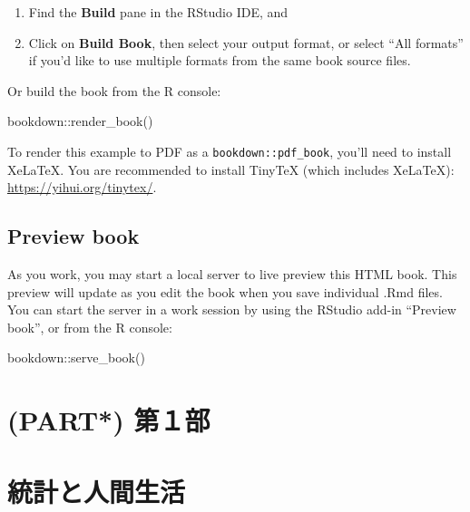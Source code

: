 \documentclass[
]{book}
\newenvironment{Shaded}{\begin{snugshade}}{\end{snugshade}}
\newcommand{\FunctionTok}[1]{\textcolor[rgb]{0.00,0.00,0.00}{#1}}
\newcommand{\NormalTok}[1]{#1}
\newcommand{\SpecialCharTok}[1]{\textcolor[rgb]{0.00,0.00,0.00}{#1}}
\theoremstyle{definition}
\theoremstyle{definition}
\theoremstyle{definition}
\theoremstyle{definition}
\theoremstyle{remark}
\begin{document}
\begin{enumerate}
\def\labelenumi{\arabic{enumi}.}
\item
  Find the \textbf{Build} pane in the RStudio IDE, and
\item
  Click on \textbf{Build Book}, then select your output format, or select ``All formats'' if you'd like to use multiple formats from the same book source files.
\end{enumerate}

Or build the book from the R console:

\begin{Shaded}
\begin{Highlighting}[]
\NormalTok{bookdown}\SpecialCharTok{::}\FunctionTok{render\_book}\NormalTok{()}
\end{Highlighting}
\end{Shaded}

To render this example to PDF as a \texttt{bookdown::pdf\_book}, you'll need to install XeLaTeX. You are recommended to install TinyTeX (which includes XeLaTeX): \url{https://yihui.org/tinytex/}.

\hypertarget{preview-book}{%
\section{Preview book}\label{preview-book}}

As you work, you may start a local server to live preview this HTML book. This preview will update as you edit the book when you save individual .Rmd files. You can start the server in a work session by using the RStudio add-in ``Preview book'', or from the R console:

\begin{Shaded}
\begin{Highlighting}[]
\NormalTok{bookdown}\SpecialCharTok{::}\FunctionTok{serve\_book}\NormalTok{()}
\end{Highlighting}
\end{Shaded}

\hypertarget{part-ux7b2cuxff11ux90e8}{%
\chapter{(PART*) 第１部}\label{part-ux7b2cuxff11ux90e8}}

\hypertarget{ux7d71ux8a08ux3068ux4ebaux9593ux751fux6d3b}{%
\chapter{統計と人間生活}\label{ux7d71ux8a08ux3068ux4ebaux9593ux751fux6d3b}}
\end{document}
